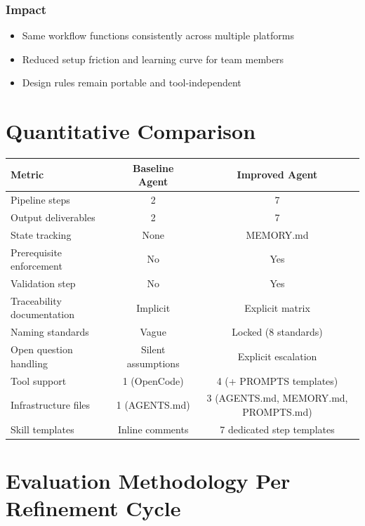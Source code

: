 \documentclass[12pt,a4paper]{article}
\begin{document}
\subsubsection{Impact}
\begin{itemize}
    \item Same workflow functions consistently across multiple platforms
    \item Reduced setup friction and learning curve for team members
    \item Design rules remain portable and tool-independent
\end{itemize}

\newpage

\section{Quantitative Comparison}

\begin{table}[h]
\centering
\begin{tabular}{|l|c|c|}
\hline
\textbf{Metric} & \textbf{Baseline Agent} & \textbf{Improved Agent} \\
\hline
Pipeline steps & 2 & 7 \\
\hline
Output deliverables & 2 & 7 \\
\hline
State tracking & None & MEMORY.md \\
\hline
Prerequisite enforcement & No & Yes \\
\hline
Validation step & No & Yes \\
\hline
Traceability documentation & Implicit & Explicit matrix \\
\hline
Naming standards & Vague & Locked (8 standards) \\
\hline
Open question handling & Silent assumptions & Explicit escalation \\
\hline
Tool support & 1 (OpenCode) & 4 (+ PROMPTS templates) \\
\hline
Infrastructure files & 1 (AGENTS.md) & 3 (AGENTS.md, MEMORY.md, PROMPTS.md) \\
\hline
Skill templates & Inline comments & 7 dedicated step templates \\
\hline
\end{tabular}
\end{table}

\section{Evaluation Methodology Per Refinement Cycle}
\end{document}
